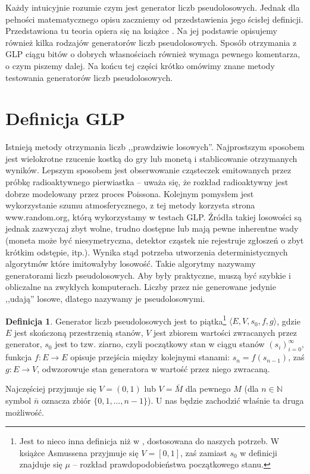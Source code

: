 \documentclass[a4paper,11pt,twoside]{book}
\theoremstyle{definition}
\newtheorem{mydef}{Definicja}[chapter]
\begin{document}
Każdy intuicyjnie rozumie czym jest generator liczb pseudolosowych. Jednak dla pełności matematycznego opisu zaczniemy od przedstawienia jego ścisłej definicji. Przedstawiona tu teoria opiera się na książce \cite{asmussen}. Na jej podstawie opisujemy również kilka rodzajów generatorów liczb pseudolosowych. Sposób otrzymania z GLP ciągu bitów o dobrych własnościach również wymaga pewnego komentarza, o czym piszemy dalej. Na końcu tej części krótko omówimy znane metody testowania generatorów liczb pseudolosowych.

\section{Definicja GLP}
\label{sec:pop_gen}
Istnieją metody otrzymania liczb ,,prawdziwie losowych''. Najprostszym sposobem jest wielokrotne rzucenie kostką do gry lub monetą i stablicowanie otrzymanych wyników. Lepszym sposobem jest obserwowanie cząsteczek emitowanych przez próbkę radioaktywnego pierwiastka -- uważa się, że rozkład radioaktywny jest dobrze modelowany przez proces Poissona. Kolejnym pomysłem jest wykorzystanie szumu atmosferycznego, z tej metody korzysta strona www.random.org, którą wykorzystamy w testach GLP. Źródła takiej losowości są jednak zazwyczaj zbyt wolne, trudno dostępne lub mają pewne inherentne wady (moneta może być niesymetryczna, detektor cząstek nie rejestruje zgłoszeń o zbyt krótkim odstępie, itp.). Wynika stąd potrzeba utworzenia deterministycznych algorytmów które imitowałyby losowość. Takie algorytmy nazywamy generatorami liczb pseudolosowych. Aby były praktyczne, muszą być szybkie i obliczalne na zwykłych komputerach. Liczby przez nie generowane jedynie ,,udają'' losowe, dlatego nazywamy je pseudolosowymi.
\begin{mydef}
\label{def:glp}
 Generator liczb pseudolosowych jest to piątka\footnote{Jest to nieco inna definicja niż w \cite{asmussen}, dostosowana do naszych potrzeb. W książce Asmussena przyjmuje się $V = [0,1]$, zaś zamiast $s_0$ w definicji znajduje się $\mu$ -- rozkład prawdopodobieństwa początkowego stanu.} $\langle E, V, s_0, f, g \rangle$, gdzie $E$ jest skończoną przestrzenią stanów, $V$ jest zbiorem wartości zwracanych przez generator, $s_0$ jest to tzw. ziarno, czyli początkowy stan w ciągu stanów $(s_i)_{i=0}^\infty$, funkcja $f:E \rightarrow E$ opisuje przejścia między kolejnymi stanami: $s_n = f(s_{n-1})$, zaś $g:E\rightarrow V$, odwzorowuje stan generatora w wartość przez niego zwracaną.
\end{mydef}
Najczęściej przyjmuje się $V = (0,1)$ lub $V = \bar{M}$ dla pewnego $M$ (dla $n \in \mathbb{N}$ symbol $\bar{n}$ oznacza zbiór $\{0,1,\ldots,n-1\}$). U nas będzie zachodzić właśnie ta druga możliwość.
\end{document}
